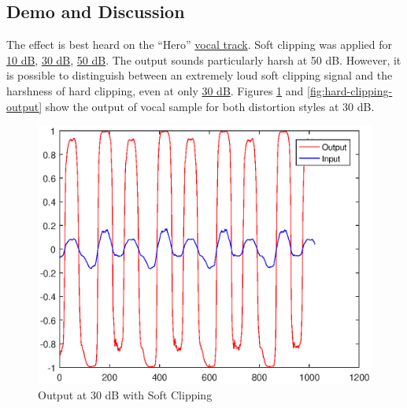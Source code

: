 \subsection{Demo and Discussion}
The effect is best heard on the ``Hero'' \href{run:../InputAudio/22-001 Original Vocal.wav}{vocal track}. Soft clipping was applied for \href{run:../OutputAudio/clipping_22-001 Original Vocal_{pre-gain=10}{soft-clipping=1}.wav}{10 dB}, \href{run:../OutputAudio/clipping_22-001 Original Vocal_{pre-gain=30}{soft-clipping=1}.wav}{30 dB}, \href{run:../OutputAudio/clipping_22-001 Original Vocal_{pre-gain=50}{soft-clipping=1}.wav}{50 dB}. The output sounds particularly harsh at 50 dB. However, it is possible to distinguish between an extremely loud soft clipping signal and the harshness of hard clipping, even at only \href{run:../OutputAudio/clipping_22-001 Original Vocal_{pre-gain=30}{soft-clipping=0}.wav}{30 dB}. Figures \ref{fig:soft-clipping-output} and \ref{fig:hard-clipping-output} show the output of vocal sample for both distortion styles at 30 dB.
\begin{figure}[ht]
    \centering
    \includegraphics[scale=0.6]{soft-clipping-waveform.eps}
    \caption{Output at 30 dB with Soft Clipping}
    \label{fig:soft-clipping-output}
\end{figure}
